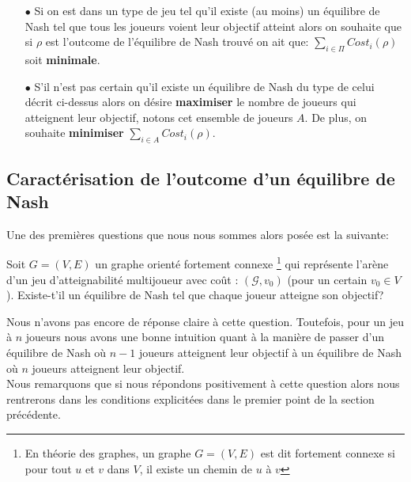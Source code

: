 \begin{itemize}
	\item[$\bullet$] Si on est dans un type de jeu tel qu'il existe (au moins) un équilibre de Nash tel que tous les joueurs voient leur objectif atteint alors on souhaite que si $\rho$ est l'outcome de l'équilibre de Nash trouvé on ait que:
	$ \sum_{i \in \Pi} Cost_i(\rho)$ soit \textbf{minimale}.
	\item[$\bullet$]S'il n'est pas certain qu'il existe un équilibre de Nash du type de celui décrit ci-dessus alors on désire \textbf{maximiser} le nombre de joueurs qui atteignent leur objectif, notons cet ensemble de joueurs $A$. De plus, on souhaite \textbf{minimiser} $\sum_{i \in A} Cost_i(\rho)$.
\end{itemize}

\subsection{Caractérisation de l'outcome d'un équilibre de Nash}

Une des premières questions que nous nous sommes alors posée est la suivante:
\begin{qst}
	\label{qst:1}
	
	Soit $G = (V,E)$ un graphe orienté fortement connexe \footnote{En théorie des graphes, un graphe $G = (V,E)$ est dit fortement connexe si pour tout $u$ et $v$ dans $V$, il existe un chemin de $u$ à $v$} qui représente l'arène d'un jeu d'atteignabilité multijoueur avec coût : $(\mathcal{G},v_{0})$ (pour un certain $v_{0} \in V$).
Existe-t'il un équilibre de Nash tel que chaque joueur atteigne son objectif?

\end{qst}

Nous n'avons pas encore de réponse claire à cette question. Toutefois, pour un jeu à $n$ joueurs nous avons une bonne intuition quant à la manière de passer d'un équilibre de Nash où $n-1$ joueurs atteignent leur objectif à un équilibre de Nash où $n$ joueurs atteignent leur objectif.\\

Nous remarquons que si nous répondons positivement à cette question alors nous rentrerons dans les conditions explicitées dans le premier point de la section précédente.




